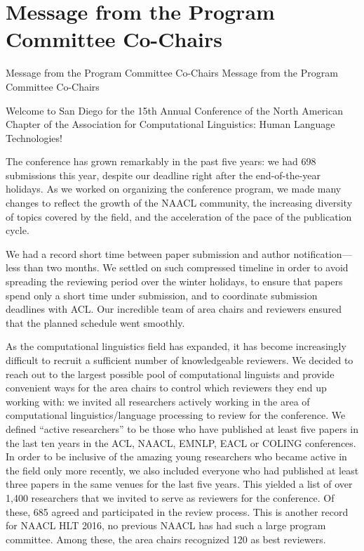 \section{Message from the Program Committee Co-Chairs}
\setheaders%
    {Message from the Program Committee Co-Chairs}%
    {Message from the Program Committee Co-Chairs}
\thispagestyle{emptyheader}

\setlength{\parskip}{.7ex}

Welcome to San Diego for the 15th Annual Conference of the North American 
Chapter of the Association for Computational Linguistics: Human Language 
Technologies!

The conference has grown remarkably in the past five years: we had 698 
submissions this year, despite our deadline right after the end-of-the-year 
holidays. As we worked on organizing the conference program, we made many 
changes to reflect the growth of the NAACL community, the increasing 
diversity of topics covered by the field, and the acceleration of the pace 
of the publication cycle.

We had a record short time between paper submission and author 
notification---less than two months. We settled on such compressed timeline 
in order to avoid spreading the reviewing period over the winter holidays, 
to ensure that papers spend only a short time under submission, and to 
coordinate submission deadlines with ACL. Our incredible team of area 
chairs and reviewers ensured that the planned schedule went smoothly.

As the computational linguistics field has expanded, it has become 
increasingly difficult to recruit a sufficient number of knowledgeable 
reviewers. We decided to reach out to the largest possible pool of 
computational linguists and provide convenient ways for the area chairs to 
control which reviewers they end up working with: we invited all 
researchers actively working in the area of computational 
linguistics/language processing to review for the conference. We defined 
``active researchers'' to be those who have published at least five papers 
in the last ten years in the ACL, NAACL, EMNLP, EACL or COLING conferences. 
In order to be inclusive of the amazing young researchers who became active 
in the field only more recently, we also included everyone who had published
at least three papers in the same venues for the last five years. This 
yielded a list of over 1,400 researchers that we invited to serve as 
reviewers for the conference. Of these, 685 agreed and participated in the 
review process. This is another record for NAACL HLT 2016, no previous 
NAACL has had such a large program committee. Among these, the area chairs 
recognized 120 as best reviewers.

